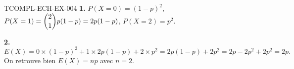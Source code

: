 \begin{corrige}{TCOMPL-ECH-EX-004}
\textbf{1.} $P(X=0)=(1-p)^2$, $P(X=1)=\dbinom{2}{1}p(1-p)=2p(1-p)$, $P(X=2)=p^2$.

\textbf{2.}
\[
  E(X) = 0\times(1-p)^2 + 1\times2p(1-p) + 2\times p^2 = 2p(1-p)+2p^2 = 2p-2p^2+2p^2 = 2p.
\]
On retrouve bien $E(X)=np$ avec $n=2$.
\end{corrige}
